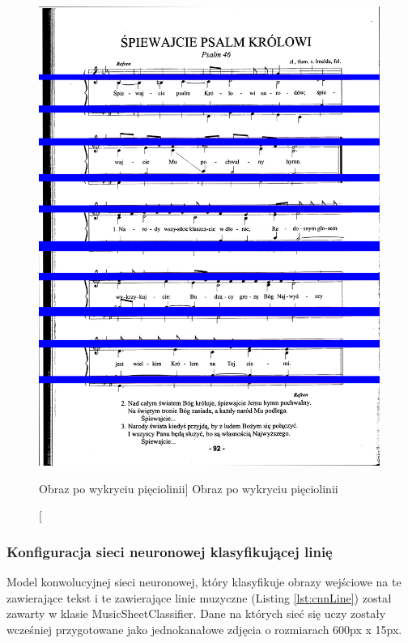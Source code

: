 \documentclass[a4paper,12pt]{article}
\newcommand\spacingIndent{2.2em}
\begin{document}
		    \begin{figure}[!ht]  
			    \begin{center}
				    \includegraphics[height=15cm, frame] {image//exampleImage//004_b.png} 
			    \end{center}
			    \caption
    			    [Obraz po wykryciu pięciolinii]  
    			    {Obraz po wykryciu pięciolinii}  
		    \end{figure} 
		
		\subsubsection{Konfiguracja sieci neuronowej klasyfikującej linię}  
		\label{subsubsection:cnnLineText}
	        \hspace{\spacingIndent}  
	        Model konwolucyjnej sieci neuronowej, który klasyfikuje obrazy wejściowe na te zawierające tekst i te zawierające linie muzyczne (Listing \ref{lst:cnnLine}) został zawarty w klasie MusicSheetClassifier. Dane na których sieć się uczy zostały wcześniej przygotowane jako jednokanałowe zdjęcia o rozmiarach 600px x 15px.
	        
	        \newpage
		
\end{document}
